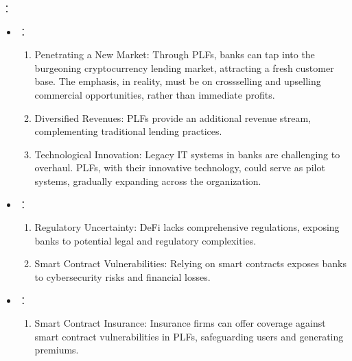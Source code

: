 \documentclass[letterpaper,10pt,english]{jupyterBook}
\begin{document}
\sphinxAtStartPar
{}：
\begin{itemize}
\item {} 
\sphinxAtStartPar
{}：
\begin{enumerate}
%
\item {} 
\sphinxAtStartPar
Penetrating a New Market: Through PLFs, banks can tap into the burgeoning cryptocurrency lending market, attracting a fresh customer base. The emphasis, in reality, must be on cross\sphinxhyphen{}selling and upselling commercial opportunities, rather than immediate profits.

\item {} 
\sphinxAtStartPar
Diversified Revenues: PLFs provide an additional revenue stream, complementing traditional lending practices.

\item {} 
\sphinxAtStartPar
Technological Innovation: Legacy IT systems in banks are challenging to overhaul. PLFs, with their innovative technology, could serve as pilot systems, gradually expanding across the organization.

\end{enumerate}

\item {} 
\sphinxAtStartPar
{}：
\begin{enumerate}
%
\item {} 
\sphinxAtStartPar
Regulatory Uncertainty: DeFi lacks comprehensive regulations, exposing banks to potential legal and regulatory complexities.

\item {} 
\sphinxAtStartPar
Smart Contract Vulnerabilities: Relying on smart contracts exposes banks to cybersecurity risks and financial losses.

\end{enumerate}

\item {} 
\sphinxAtStartPar
{}：
\begin{enumerate}
%
\item {} 
\sphinxAtStartPar
Smart Contract Insurance: Insurance firms can offer coverage against smart contract vulnerabilities in PLFs, safeguarding users and generating premiums.


\end{enumerate}
\end{itemize}
\end{document}

